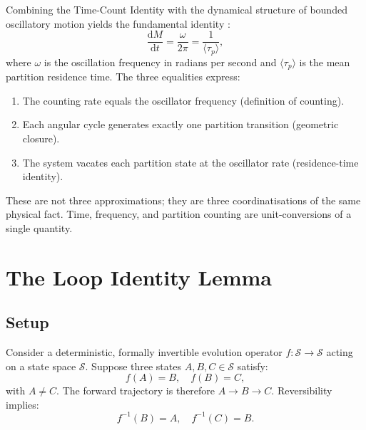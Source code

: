 \documentclass[twocolumn,10pt,a4paper]{article}
\theoremstyle{definition}
\theoremstyle{remark}
\newcommand{\StateSpace}{\mathcal{S}}
\newcommand{\tp}{\langle\tau_p\rangle}
\newcommand{\dM}{\mathrm{d}M}
\newcommand{\dt}{\mathrm{d}t}
\begin{document}
Combining the Time-Count Identity with the dynamical structure of bounded oscillatory motion yields the fundamental identity \citep{sachikonye2025counting}:
\begin{equation}
    \frac{\dM}{\dt} = \frac{\omega}{2\pi} = \frac{1}{\tp},
    \label{eq:fundamental}
\end{equation}
where $\omega$ is the oscillation frequency in radians per second and $\tp$ is the mean partition residence time. The three equalities express:
\begin{enumerate}[leftmargin=1.2em,itemsep=0.2em]
    \item The counting rate equals the oscillator frequency (definition of counting).
    \item Each angular cycle generates exactly one partition transition (geometric closure).
    \item The system vacates each partition state at the oscillator rate (residence-time identity).
\end{enumerate}

These are not three approximations; they are three coordinatisations of the same physical fact. Time, frequency, and partition counting are unit-conversions of a single quantity.

\section{The Loop Identity Lemma}
\label{sec:loop}

\subsection{Setup}

Consider a deterministic, formally invertible evolution operator $f: \StateSpace \to \StateSpace$ acting on a state space $\StateSpace$. Suppose three states $A, B, C \in \StateSpace$ satisfy:
\begin{equation}
    f(A) = B, \quad f(B) = C,
    \label{eq:abc}
\end{equation}
with $A \neq C$. The forward trajectory is therefore $A \to B \to C$. Reversibility implies:
\begin{equation}
    f^{-1}(B) = A, \quad f^{-1}(C) = B.
    \label{eq:abc-reverse}
\end{equation}
\end{document}
